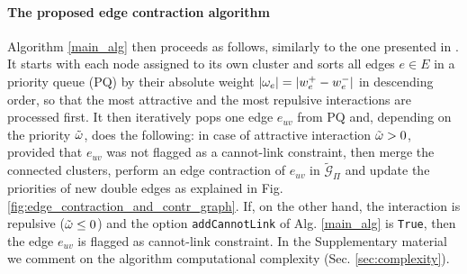 \paragraph{The proposed edge contraction algorithm} Algorithm \ref{main_alg} then proceeds as follows, similarly to the one presented in \cite{levinkov2017comparative}. It starts with each node assigned to its own cluster and sorts all edges $e\in E$ in a priority queue (PQ) by their absolute weight $|\omega_e|=|w_e^+ - w_e^-|$ in descending order, so that the most attractive and the most repulsive interactions are processed first. It then iteratively pops one edge $e_{uv}$ from PQ and, depending on the priority $\tilde{\omega}$, does the following: in case of attractive interaction $\tilde{\omega}>0$, provided that $e_{uv}$ was not flagged as a cannot-link constraint, then merge the connected clusters, perform an edge contraction of $e_{uv}$ in $\tilde{\mathcal{G}}_\Pi$ and update the priorities of new double edges as explained in Fig. \ref{fig:edge_contraction_and_contr_graph}. 
If, on the other hand, the interaction is repulsive ($\tilde{\omega}\leq 0$) and the option \texttt{addCannotLink} of Alg. \ref{main_alg} is \texttt{True}, then the edge $e_{uv}$ is flagged as cannot-link constraint.
In the Supplementary material we comment on the algorithm computational complexity (Sec. \ref{sec:complexity}).

